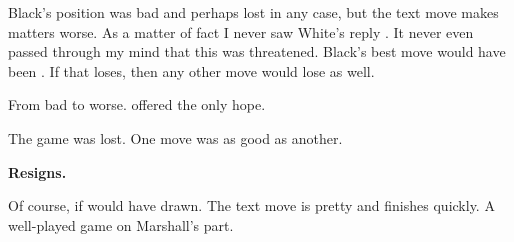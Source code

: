 \documentclass[10pt,twoside]{article}
\begin{document}

\board

Black's position was bad and perhaps lost in any case, but the text move makes matters worse. As a matter of fact I never saw White's reply . It never even passed through my mind that this was threatened. Black's best move would have been . If that loses, then any other move would lose as well.


From bad to worse.  offered the only hope.


The game was lost. One move was as good as another.


\noindent\textbf{Resigns.}

Of course, if  would have drawn. The text move is pretty and finishes quickly. A well-played game on Marshall's part.
\end{document}
